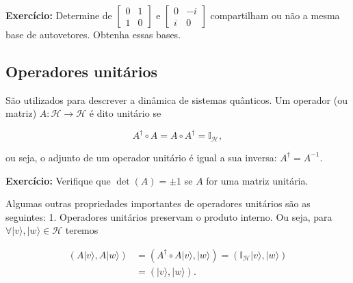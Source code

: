 \documentclass[11pt]{article}
\begin{document}
\textbf{Exercício:} Determine de
\(\begin{bmatrix}0&1\\1&0\end{bmatrix}\) e
\(\begin{bmatrix}0&-i\\i&0\end{bmatrix}\) compartilham ou não a mesma
base de autovetores. Obtenha essas bases.

    \subsection{Operadores unitários}\label{operadores-unituxe1rios}

São utilizados para descrever a dinâmica de sistemas quânticos. Um
operador (ou matriz) \(A:\mathcal{H}\rightarrow\mathcal{H}\) é dito
unitário se

\begin{equation}
A^{\dagger}\circ A = A\circ A^{\dagger}=\mathbb{I}_{\mathcal{H}},
\end{equation}

ou seja, o adjunto de um operador unitário é igual a sua inversa:
\(A^{\dagger}=A^{-1}\).

\textbf{Exercício:} Verifique que \(\det(A)=\pm1\) se \(A\) for uma
matriz unitária.

Algumas outras propriedades importantes de operadores unitários são as
seguintes: 1. Operadores unitários preservam o produto interno. Ou seja,
para \(\forall|v\rangle,|w\rangle\in\mathcal{H}\) teremos

\begin{align}
(A|v\rangle,A|w\rangle) & = (A^{\dagger}\circ A|v\rangle,|w\rangle) = (\mathbb{I}_{\mathcal{H}}|v\rangle,|w\rangle) \\
& = (|v\rangle,|w\rangle).
\end{align}
\end{document}
